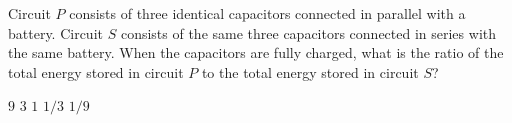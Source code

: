 \begin{questions}\setcounter{question}{15}\question
Circuit $P$ consists of three identical capacitors connected in parallel with a battery. Circuit $S$ consists of the same three capacitors connected in series with the same battery. When the capacitors are fully charged, what is the ratio of the total energy stored in circuit $P$ to the total energy stored in circuit $S$?

\begin{oneparchoices}
\choice $9$
\choice $3$
\choice $1$
\choice $1/3$
\choice $1/9$
\end{oneparchoices}\end{questions}

